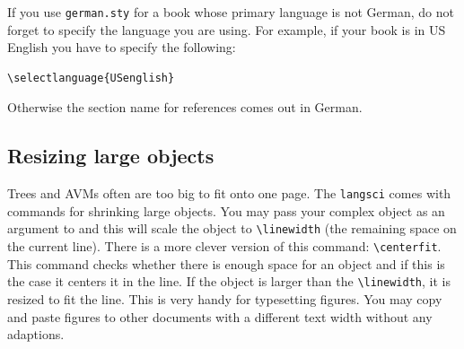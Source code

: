 If you use \verb+german.sty+ for a book whose primary language is not German, do not forget to
specify the language you are using. For example, if your book is in US English you have to specify
the following:
\begin{verbatim}
\selectlanguage{USenglish}
\end{verbatim}
Otherwise the section name for references comes out in German.

\subsection{Resizing large objects}

Trees and AVMs often are too big to fit onto one page. The \texttt{langsci} comes with commands for
shrinking large objects. You may pass your complex object as an argument to \texttt{\oneline} and
this will scale the object to \verb+\linewidth+ (the remaining space on the current line). There is
a more clever version of this command: \verb+\centerfit+. This command checks whether there is
enough space for an object and if this is the case it centers it in the line. If the object is
larger than the \verb+\linewidth+, it is resized to fit the line. This is very handy for typesetting
figures. You may copy and paste figures to other documents with a different text width without any
adaptions.


